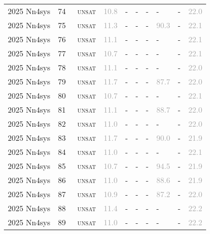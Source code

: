 \begin{center}
{\begin{longtable}{@{}llllllllll@{}}
2025 Nn4sys & 74 & ~\textsc{unsat} & \textcolor{darkgray}{10.8} & - & - & - & - & - & \textcolor{darkgray}{22.0} \\
2025 Nn4sys & 75 & ~\textsc{unsat} & \textcolor{darkgray}{11.3} & - & - & - & \textcolor{darkgray}{90.3} & - & \textcolor{darkgray}{22.1} \\
2025 Nn4sys & 76 & ~\textsc{unsat} & \textcolor{darkgray}{11.1} & - & - & - & - & - & \textcolor{darkgray}{22.1} \\
2025 Nn4sys & 77 & ~\textsc{unsat} & \textcolor{darkgray}{10.7} & - & - & - & - & - & \textcolor{darkgray}{22.1} \\
2025 Nn4sys & 78 & ~\textsc{unsat} & \textcolor{darkgray}{11.1} & - & - & - & - & - & \textcolor{darkgray}{22.0} \\
2025 Nn4sys & 79 & ~\textsc{unsat} & \textcolor{darkgray}{11.7} & - & - & - & \textcolor{darkgray}{87.7} & - & \textcolor{darkgray}{22.0} \\
2025 Nn4sys & 80 & ~\textsc{unsat} & \textcolor{darkgray}{10.7} & - & - & - & - & - & \textcolor{darkgray}{22.1} \\
2025 Nn4sys & 81 & ~\textsc{unsat} & \textcolor{darkgray}{11.1} & - & - & - & \textcolor{darkgray}{88.7} & - & \textcolor{darkgray}{22.0} \\
2025 Nn4sys & 82 & ~\textsc{unsat} & \textcolor{darkgray}{11.0} & - & - & - & - & - & \textcolor{darkgray}{22.0} \\
2025 Nn4sys & 83 & ~\textsc{unsat} & \textcolor{darkgray}{11.7} & - & - & - & \textcolor{darkgray}{90.0} & - & \textcolor{darkgray}{21.9} \\
2025 Nn4sys & 84 & ~\textsc{unsat} & \textcolor{darkgray}{11.0} & - & - & - & - & - & \textcolor{darkgray}{22.1} \\
2025 Nn4sys & 85 & ~\textsc{unsat} & \textcolor{darkgray}{10.7} & - & - & - & \textcolor{darkgray}{94.5} & - & \textcolor{darkgray}{21.9} \\
2025 Nn4sys & 86 & ~\textsc{unsat} & \textcolor{darkgray}{11.0} & - & - & - & \textcolor{darkgray}{88.6} & - & \textcolor{darkgray}{21.9} \\
2025 Nn4sys & 87 & ~\textsc{unsat} & \textcolor{darkgray}{10.9} & - & - & - & \textcolor{darkgray}{87.2} & - & \textcolor{darkgray}{22.0} \\
2025 Nn4sys & 88 & ~\textsc{unsat} & \textcolor{darkgray}{11.4} & - & - & - & - & - & \textcolor{darkgray}{22.2} \\
2025 Nn4sys & 89 & ~\textsc{unsat} & \textcolor{darkgray}{11.0} & - & - & - & - & - & \textcolor{darkgray}{22.2} \\

\end{longtable}}
\end{center}
